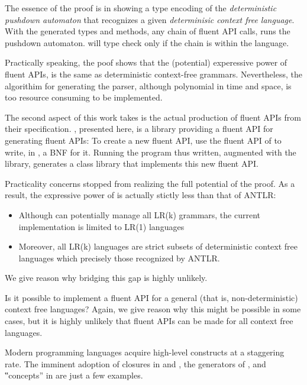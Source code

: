 The essence of the proof is in showing a \Java type encoding of
  the \emph{deterministic pushdown automaton} that recognizes
  a given \emph{determinisic context free language}. 
With the generated types and methods, any chain of fluent API calls,
  runs the pushdown automaton.
  will type check only if the chain is within the language.

Practically speaking, the poof shows that the (potential)
  experessive power of fluent APIs,
  is the same as deterministic context-free grammars.
Nevertheless, the algorithim for generating the parser, although polynomial
  in time and space, is too resource consuming to be implemented. 

The second aspect of this work takes is the actual production 
  of fluent APIs from their specification.
\Self, presented here, is a \Java library providing a fluent API for generating fluent APIs:
To create a new fluent API, use the fluent API of \Self to write, in \Java, a BNF for it.
Running the \Java program thus written, augmented with the \Self library,
  generates a \Java class library that implements this new fluent API.

Practicality concerns stopped \Self from realizing the full potential of the proof.
As a result, the expressive power of \Self is actually stictly less than that of ANTLR:
\begin{itemize}
  \item Although \Self can potentially manage all LR(k) grammars,
        the current implementation is limited to LR(1) languages
  \item Moreover, all LR(k) languages are strict subsets of deterministic context free languages %
      which precisely those recognized by ANTLR. %
\end{itemize}
We give reason why bridging this gap is highly unlikely.

Is it possible to implement a fluent API for a general 
  (that is, non-deterministic) context free languages? 
Again, we give reason why this might be possible in some cases,
  but it is highly unlikely that fluent APIs can be made for all context free languages.

Modern programming languages acquire high-level constructs
  at a staggering rate.
The imminent adoption of closures in \Java and \CC,
  the generators of \CSharp, and ‟concepts” in
  \CC are just a few examples.

